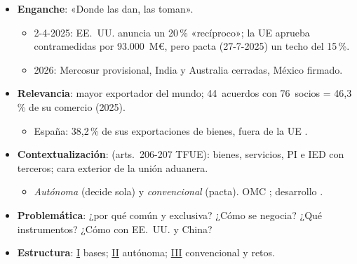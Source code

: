 \documentclass{article}
\begin{document}
\cabecerarepaso
\begin{columnas}

\begin{itemize}
\item \textbf{Enganche}: «Donde las dan, las toman».
  \begin{itemize}
  \item 2-4-2025: EE.~UU. anuncia un 20\,\% «recíproco»; la UE aprueba contramedidas por 93.000~M€, pero pacta (27-7-2025) un techo del 15\,\%.
  \item 2026: Mercosur provisional, India y Australia cerradas, México firmado.
  \end{itemize}
\item \textbf{Relevancia}: mayor exportador del mundo; 44~acuerdos con 76~socios = 46,3\,\% de su comercio (2025).
  \begin{itemize}
  \item España: 38,2\,\% de sus exportaciones de bienes, fuera de la UE .
  \end{itemize}
\item \textbf{Contextualización}:  (arts.~206-207 TFUE): bienes, servicios, PI e IED con terceros; cara exterior de la unión aduanera.
  \begin{itemize}
  \item \emph{Autónoma} (decide sola) y \emph{convencional} (pacta). OMC ; desarrollo .
  \end{itemize}
\item \textbf{Problemática}: ¿por qué común y exclusiva? ¿Cómo se negocia? ¿Qué instrumentos? ¿Cómo con EE.~UU. y China?
\item \textbf{Estructura}: \hyperref[rep:I]{I} bases; \hyperref[rep:II]{II} autónoma; \hyperref[rep:III]{III} convencional y retos.
\end{itemize}


\end{columnas}
\end{document}

